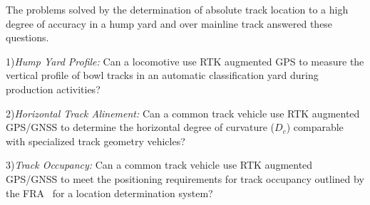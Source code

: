 The problems solved by the determination of absolute track location to a high degree of accuracy in a hump yard and over mainline track answered these questions.

1)\emph{Hump Yard Profile:}
Can a locomotive use RTK augmented GPS to measure the  vertical profile of bowl tracks in an automatic classification yard during production activities?

2)\emph{Horizontal Track Alinement:}
Can a common track vehicle use RTK augmented GPS/GNSS to determine the horizontal degree of curvature ($D_c$) comparable with specialized track geometry vehicles?

3)\emph{Track Occupancy:}
Can a common track vehicle use RTK augmented GPS/GNSS to meet the positioning requirements for track occupancy outlined by the FRA~\citep[pp.6-7]{1995FRADiffe} for a location determination system?

